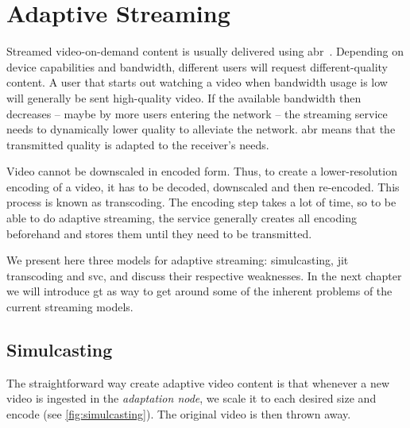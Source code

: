 


\section{Adaptive Streaming}
\label{sec:adaptive-streaming}
Streamed video-on-demand content is usually delivered using \gls{abr}~\cite{Rusert}. Depending on device capabilities and bandwidth, different users will request different-quality content. A user that starts out watching a video when bandwidth usage is low will generally be sent high-quality video. If the available bandwidth then decreases -- maybe by more users entering the network -- the streaming service needs to dynamically lower quality to alleviate the network. \gls{abr} means that the transmitted quality is adapted to the receiver's needs.

Video cannot be downscaled in encoded form. Thus, to create a lower-resolution encoding of a video, it has to be decoded, downscaled and then re-encoded. This process is known as transcoding. The encoding step takes a lot of time, so to be able to do adaptive streaming, the service generally creates all encoding beforehand and stores them until they need to be transmitted. %


We present here three models for adaptive streaming: simulcasting, \gls{jit} transcoding and \gls{svc}, and discuss their respective weaknesses. In the next chapter we will introduce \gls{gt} as way to get around some of the inherent problems of the current streaming models.

\subsection{Simulcasting}
The straightforward way create adaptive video content is that whenever a new video is ingested in the \textit{adaptation node}, we scale it to each desired size and encode (see \cref{fig:simulcasting}). The original video is then thrown away.

